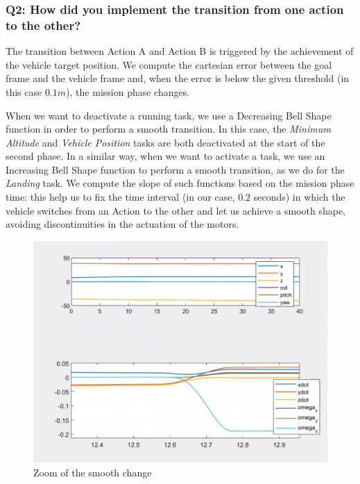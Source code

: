 \documentclass{article}
\begin{document}



\subsubsection{Q2: How did you implement the transition from one action to the other?}

The transition between Action A and Action B is triggered by the achievement of the vehicle target position. We compute the cartesian error between the goal frame and the vehicle frame and, when the error is below the given threshold (in this case $0.1m$), the mission phase changes. 

When we want to deactivate a running task, we use a Decreasing Bell Shape function in order to perform a smooth transition. In this case, the \textit{Minimum Altitude} and \textit{Vehicle Position} tasks are both deactivated at the start of the second phase. In a similar way, when we want to activate a task, we use an Increasing Bell Shape function to perform a smooth transition, as we do for the \textit{Landing} task. 
We compute the slope of such functions based on the mission phase time: this help us to fix the time interval (in our case, $0.2$ seconds) in which the vehicle switches from an Action to the other and let us achieve a smooth shape, avoiding discontinuities in the actuation of the motors.
\begin{figure}[!htb]
    \centering
    \includegraphics[scale=0.25]{222_smooth_ppdot.png}
    \caption{Zoom of the smooth change}
    \label{images_2_3_1}
\end{figure}
\end{document}
